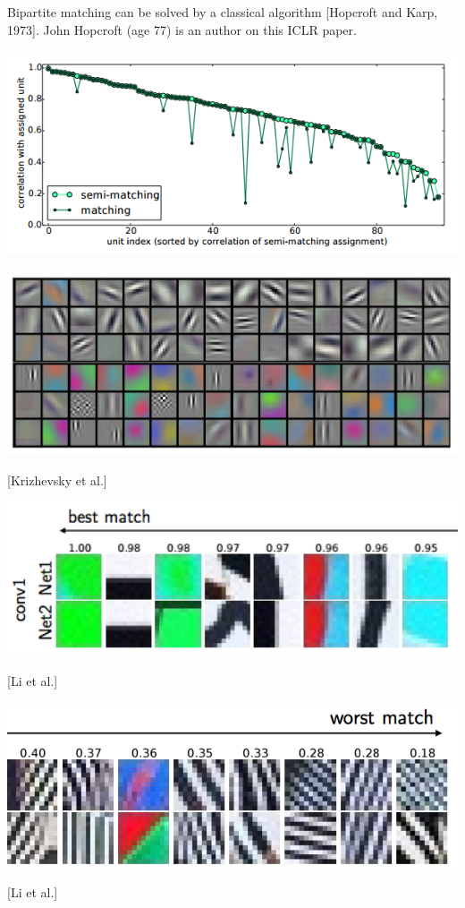 {\vfill
Bipartite matching can be solved by a classical algorithm [Hopcroft and Karp, 1973].  John Hopcroft (age 77) is an author on this ICLR paper.


\centerline{\includegraphics[width = 9in]{../images/Correlations1}}



\centerline{\includegraphics[width = 9.5in]{../images/AlexnetL1}}
\centerline{[Krizhevsky et al.]}


\centerline{\includegraphics[width = 8in]{../images/Correlations2}}
\centerline{[Li et al.]}


\centerline{\includegraphics[width = 8in]{../images/Correlations3}}
\centerline{[Li et al.]}

}
